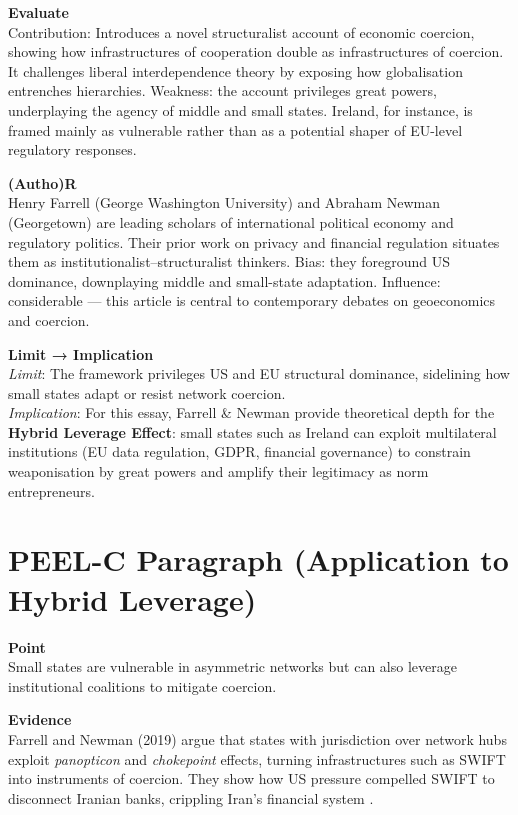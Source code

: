 \textbf{Evaluate} \\
Contribution: Introduces a novel structuralist account of economic coercion, showing how infrastructures of cooperation double as infrastructures of coercion. It challenges liberal interdependence theory by exposing how globalisation entrenches hierarchies. Weakness: the account privileges great powers, underplaying the agency of middle and small states. Ireland, for instance, is framed mainly as vulnerable rather than as a potential shaper of EU-level regulatory responses.

\textbf{(Autho)R} \\
Henry Farrell (George Washington University) and Abraham Newman (Georgetown) are leading scholars of international political economy and regulatory politics. Their prior work on privacy and financial regulation situates them as institutionalist–structuralist thinkers. Bias: they foreground US dominance, downplaying middle and small-state adaptation. Influence: considerable — this article is central to contemporary debates on geoeconomics and coercion.

\textbf{Limit → Implication} \\
\textit{Limit}: The framework privileges US and EU structural dominance, sidelining how small states adapt or resist network coercion. \\
\textit{Implication}: For this essay, Farrell \& Newman provide theoretical depth for the \textbf{Hybrid Leverage Effect}: small states such as Ireland can exploit multilateral institutions (EU data regulation, GDPR, financial governance) to constrain weaponisation by great powers and amplify their legitimacy as norm entrepreneurs.

\section*{PEEL-C Paragraph (Application to Hybrid Leverage)}

\textbf{Point} \\
Small states are vulnerable in asymmetric networks but can also leverage institutional coalitions to mitigate coercion.  

\textbf{Evidence} \\
Farrell and Newman (2019) argue that states with jurisdiction over network hubs exploit \textit{panopticon} and \textit{chokepoint} effects, turning infrastructures such as SWIFT into instruments of coercion. They show how US pressure compelled SWIFT to disconnect Iranian banks, crippling Iran’s financial system \parencite{FARRELL_2019}.  

